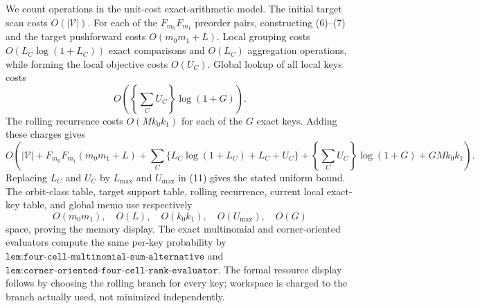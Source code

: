 We count operations in the unit-cost exact-arithmetic model. The initial target scan costs \(O(|\mathcal V|)\). For each of the \(F_{m_0}F_{m_1}\) preorder pairs, constructing (6)--(7) and the target pushforward costs \(O(m_0m_1+L)\). Local grouping costs \(O(L_C\log(1+L_C))\) exact comparisons and \(O(L_C)\) aggregation operations, while forming the local objective costs \(O(U_C)\). Global lookup of all local keys costs
\[
O\!\left(\left\{\sum_CU_C\right\}\log(1+G)\right).
\tag{10}
\]
The rolling recurrence costs \(O(Mk_0k_1)\) for each of the \(G\) exact keys. Adding these charges gives
\[
O\!\left(|\mathcal V|+F_{m_0}F_{m_1}(m_0m_1+L)+\sum_C\{L_C\log(1+L_C)+L_C+U_C\}+\left\{\sum_CU_C\right\}\log(1+G)+GMk_0k_1\right).
\tag{11}
\]
Replacing \(L_C\) and \(U_C\) by \(L_{\max}\) and \(U_{\max}\) in (11) gives the stated uniform bound. The orbit-class table, target support table, rolling recurrence, current local exact-key table, and global memo use respectively
\[
O(m_0m_1),\quad O(L),\quad O(k_0k_1),\quad O(U_{\max}),\quad O(G)
\tag{12}
\]
space, proving the memory display. The exact multinomial and corner-oriented evaluators compute the same per-key probability by \(\texttt{lem:four-cell-multinomial-sum-alternative}\) and \(\texttt{lem:corner-oriented-four-cell-rank-evaluator}\). The formal resource display follows by choosing the rolling branch for every key; workspace is charged to the branch actually used, not minimized independently.